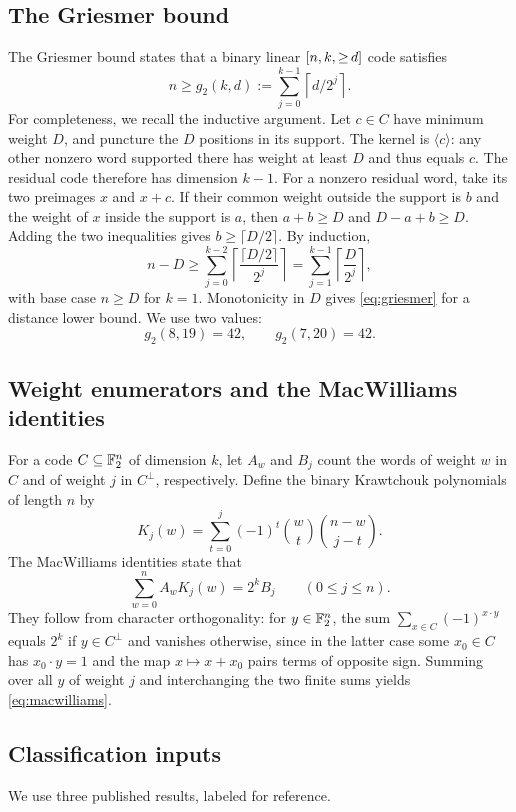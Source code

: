 \subsection{The Griesmer bound}
The Griesmer bound \citep{griesmer1960} states that a binary linear $\mbox{\ensuremath{[n,k,{\ge}\,d]}}$ code satisfies
\begin{equation}\label{eq:griesmer}
 n\ge g_2(k,d):=\sum_{j=0}^{k-1}\left\lceil d/2^j\right\rceil.
\end{equation}
For completeness, we recall the inductive argument. Let $c\in C$ have minimum weight $D$, and puncture the $D$ positions in its support. The kernel is $\langle c\rangle$: any other nonzero word supported there has weight at least $D$ and thus equals $c$. The residual code therefore has dimension $k-1$. For a nonzero residual word, take its two preimages $x$ and $x+c$. If their common weight outside the support is $b$ and the weight of $x$ inside the support is $a$, then $a+b\ge D$ and $D-a+b\ge D$. Adding the two inequalities gives $b\ge\lceil D/2\rceil$. By induction,
\[
 n-D\ge\sum_{j=0}^{k-2}\left\lceil\frac{\lceil D/2\rceil}{2^j}\right\rceil
       =\sum_{j=1}^{k-1}\left\lceil\frac D{2^j}\right\rceil,
\]
with base case $n\ge D$ for $k=1$. Monotonicity in $D$ gives \eqref{eq:griesmer} for a distance lower bound. We use two values:
\[
 g_2(8,19)=42,\qquad g_2(7,20)=42.
\]

\subsection{Weight enumerators and the MacWilliams identities}
For a code $C\subseteq\mathbb F_2^n$ of dimension $k$, let $A_w$ and $B_j$ count the words of weight $w$ in $C$ and of weight $j$ in $C^\perp$, respectively. Define the binary Krawtchouk polynomials of length $n$ by
\[
 K_j(w)=\sum_{t=0}^j(-1)^t\binom wt\binom{n-w}{j-t}.
\]
The MacWilliams identities \citep{macwilliams1963} state that
\begin{equation}\label{eq:macwilliams}
 \sum_{w=0}^{n}A_wK_j(w)=2^{k}B_j\qquad(0\le j\le n).
\end{equation}
They follow from character orthogonality: for $y\in\mathbb F_2^n$, the sum $\sum_{x\in C}(-1)^{x\cdot y}$ equals $2^k$ if $y\in C^\perp$ and vanishes otherwise, since in the latter case some $x_0\in C$ has $x_0\cdot y=1$ and the map $x\mapsto x+x_0$ pairs terms of opposite sign. Summing over all $y$ of weight $j$ and interchanging the two finite sums yields \eqref{eq:macwilliams}.

\subsection{Classification inputs}
We use three published results, labeled for reference.

